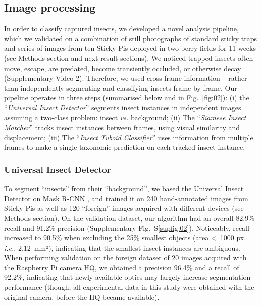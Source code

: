 \documentclass[12pt]{article}
\begin{document}
\begin{linenumbers}
		
		\subsection*{Image processing}
		In order to classify captured insects, we developed a novel analysis pipeline, which we validated on a combination of still photographs of standard sticky traps and series of images from ten Sticky Pis deployed in two berry fields for 11 weeks (see Methods section and next result sections). We noticed trapped insects often move, escape, are predated, become transiently occluded, or otherwise decay (Supplementary Video 2). Therefore, we used cross-frame information ‒ rather than independently segmenting and classifying insects frame-by-frame. Our pipeline operates in three steps (summarised below and in Fig.~\ref{fig:02}): 
		(i) the “\emph{Universal Insect Detector}” segments insect instances in independent images assuming a two-class problem: insect \emph{vs.} background;
		(ii) The “\emph{Siamese Insect Matcher}” tracks insect instances between frames, using visual similarity and displacement;
		(iii) The “\emph{Insect Tuboid Classifier}” uses information from multiple frames to make a single taxonomic prediction on each tracked insect instance.

		\subsubsection*{Universal Insect Detector}
		To segment “insects” from their “background”, we based the Universal Insect Detector on Mask R-CNN \cite{he_mask_2017}, and trained it on 240 hand-annotated images from Sticky Pis as well as  120 ``foreign'' images acquired with different devices (see Methods section).
		On the validation dataset, our algorithm had an overall 82.9\% recall and 91.2\% precision (Supplementary Fig.~S\ref{supfig:02}). Noticeably, recall increased to 90.5\% when excluding the 25\% smallest objects (area <~1000 px. \emph{i.e.}, 2.12~mm²), indicating that the smallest insect instances are ambiguous.
		When performing validation on the foreign dataset of 20 images acquired with  the Raspberry Pi camera HQ, we obtained a precision 96.4\% and a recall of 92.2\%, indicating that newly available optics may largely increase segmentation performance (though, all experimental data in this study were obtained with the original camera, before the HQ became available).


\end{linenumbers}
\end{document}
